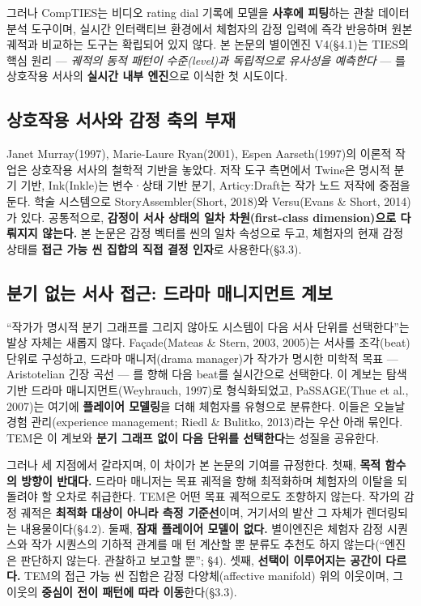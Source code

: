 \documentclass[11pt, a4paper]{article}
\begin{document}
그러나 CompTIES는 비디오 rating dial 기록에 모델을 \textbf{사후에 피팅}하는 관찰 데이터 분석 도구이며, 실시간 인터랙티브 환경에서 체험자의 감정 입력에 즉각 반응하며 원본 궤적과 비교하는 도구는 확립되어 있지 않다. 본 논문의 별이엔진 V4(\S4.1)는 TIES의 핵심 원리 --- \textit{궤적의 동적 패턴이 수준(level)과 독립적으로 유사성을 예측한다} --- 를 상호작용 서사의 \textbf{실시간 내부 엔진}으로 이식한 첫 시도이다.

\subsection{상호작용 서사와 감정 축의 부재}

Janet Murray(1997), Marie-Laure Ryan(2001), Espen Aarseth(1997)의 이론적 작업은 상호작용 서사의 철학적 기반을 놓았다. 저작 도구 측면에서 Twine은 명시적 분기 기반, Ink(Inkle)는 변수·상태 기반 분기, Articy:Draft는 작가 노드 저작에 중점을 둔다. 학술 시스템으로 StoryAssembler(Short, 2018)와 Versu(Evans \& Short, 2014)가 있다. 공통적으로, \textbf{감정이 서사 상태의 일차 차원(first-class dimension)으로 다뤄지지 않는다.} 본 논문은 감정 벡터를 씬의 일차 속성으로 두고, 체험자의 현재 감정 상태를 \textbf{접근 가능 씬 집합의 직접 결정 인자}로 사용한다(\S3.3).

\subsection{분기 없는 서사 접근: 드라마 매니지먼트 계보}

``작가가 명시적 분기 그래프를 그리지 않아도 시스템이 다음 서사 단위를 선택한다''는 발상 자체는 새롭지 않다. Façade(Mateas \& Stern, 2003, 2005)는 서사를 조각(beat) 단위로 구성하고, 드라마 매니저(drama manager)가 작가가 명시한 미학적 목표 --- Aristotelian 긴장 곡선 --- 를 향해 다음 beat를 실시간으로 선택한다. 이 계보는 탐색 기반 드라마 매니지먼트(Weyhrauch, 1997)로 형식화되었고, PaSSAGE(Thue et al., 2007)는 여기에 \textbf{플레이어 모델링}을 더해 체험자를 유형으로 분류한다. 이들은 오늘날 경험 관리(experience management; Riedl \& Bulitko, 2013)라는 우산 아래 묶인다. TEM은 이 계보와 \textbf{분기 그래프 없이 다음 단위를 선택한다}는 성질을 공유한다.

그러나 세 지점에서 갈라지며, 이 차이가 본 논문의 기여를 규정한다. 첫째, \textbf{목적 함수의 방향이 반대다.} 드라마 매니저는 목표 궤적을 향해 최적화하며 체험자의 이탈을 되돌려야 할 오차로 취급한다. TEM은 어떤 목표 궤적으로도 조향하지 않는다. 작가의 감정 궤적은 \textbf{최적화 대상이 아니라 측정 기준선}이며, 거기서의 발산 그 자체가 렌더링되는 내용물이다(\S4.2). 둘째, \textbf{잠재 플레이어 모델이 없다.} 별이엔진은 체험자 감정 시퀀스와 작가 시퀀스의 기하적 관계를 매 턴 계산할 뿐 분류도 추천도 하지 않는다(``엔진은 판단하지 않는다. 관찰하고 보고할 뿐''; \S4). 셋째, \textbf{선택이 이루어지는 공간이 다르다.} TEM의 접근 가능 씬 집합은 감정 다양체(affective manifold) 위의 이웃이며, 그 이웃의 \textbf{중심이 전이 패턴에 따라 이동}한다(\S3.3).
\end{document}
